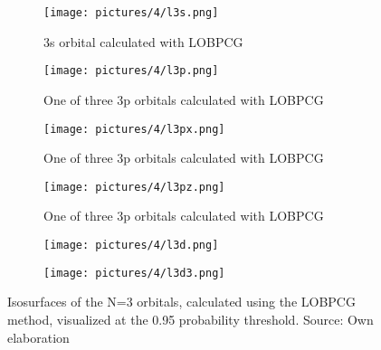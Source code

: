 \begin{figure}[t]
	\centering
	\begin{subfigure}[b]{0.45\textwidth}
		\centering
		\texttt{[image: pictures/4/l3s.png]}
		\caption{3s orbital calculated with LOBPCG}
		\label{fig:l3s}
	\end{subfigure}
	\hfill
	\begin{subfigure}[b]{0.45\textwidth}
		\centering
		\texttt{[image: pictures/4/l3p.png]}
		\caption{One of three 3p orbitals calculated with LOBPCG}
		\label{fig:l3p}
	\end{subfigure}
	\hfill
	
	\bigskip
	
	\begin{subfigure}[b]{0.45\textwidth}
		\centering
		\texttt{[image: pictures/4/l3px.png]}
		\caption{One of three 3p orbitals calculated with LOBPCG}
		\label{fig:l3px}
	\end{subfigure}
	\hfill
	\begin{subfigure}[b]{0.45\textwidth}
		\centering
		\texttt{[image: pictures/4/l3pz.png]}
		\caption{One of three 3p orbitals calculated with LOBPCG}
		\label{fig:l3pz}
	\end{subfigure}
	\hfill
	
	\bigskip
	
	\begin{subfigure}[b]{0.45\textwidth}
		\centering
		\texttt{[image: pictures/4/l3d.png]}
		\caption{}
		\label{fig:l3d}
	\end{subfigure}
	\hfill	
	\begin{subfigure}[b]{0.45\textwidth}
		\centering
		\texttt{[image: pictures/4/l3d3.png]}
		\caption{}
		\label{fig:l3d3}
	\end{subfigure}
	\hfill	
	\caption{Isosurfaces of the N=3 orbitals, calculated using the LOBPCG method, visualized at the 0.95 probability threshold. Source: Own elaboration}
	\label{fig:3-orbitals}
\end{figure} 